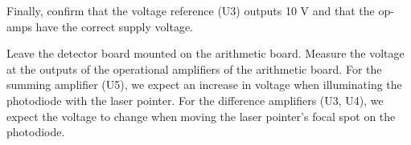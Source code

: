 Finally, confirm that the voltage reference (U3) outputs 10 V and that the op-amps have the correct supply voltage.


Leave the detector board mounted on the arithmetic board.
Measure the voltage at the outputs of the operational amplifiers of the arithmetic board.
For the summing amplifier (U5), we expect an increase in voltage when illuminating the photodiode with the laser pointer.
For the difference amplifiers (U3, U4), we expect the voltage to change when moving the laser pointer's focal spot on the photodiode.


